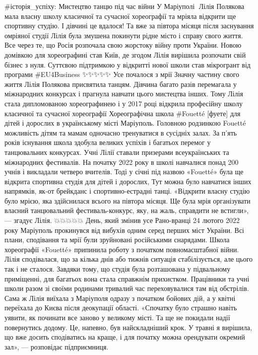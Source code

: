 #історія_успіху: Мистецтво танцю під час війни
У Маріуполі 💃Лілія Полякова мала власну школу класичної та сучасної хореографії та мріяла відкрити ще спортивну студію. І дівчині це вдалося! Та вже за півтора місяця після заснування омріяної студії Лілія була змушена покинути рідне місто і справу свого життя. Все через те, що Росія розпочала свою жорстоку війну проти України. Новою домівкою для хореографині став Київ, де згодом Лілія вирішила розпочати свій бізнес з нуля. Суттєвою підтримкою у відкритті нової школи став мікрогрант від програми #EU4Business
✨✨✨✨✨ Усе почалося з мрії
Значну частину свого життя Лілія Полякова присвятила танцям. Дівчина багато разів перемагала у міжнародних конкурсах і прагнула навчати цього мистецтва інших. Тому Лілія стала дипломованою хореографинею і у 2017 році відкрила професійну школу класичної та сучасної хореографії Хореографічна школа #Fouetté [фуете] для дітей і дорослих в українському місті Маріуполь.
Головною родзинкою Fouetté можливість дітям та мамам одночасно тренуватися в сусідніх залах. За п’ять років існування школа здобула великих успіхів і багатьох перемог у танцювальних конкурсах. Учні Лілії ставали призерами всеукраїнських та міжнародних фестивалів. 
На початку 2022 року в школі навчалися понад 200 учнів і викладали четверо вчителів. Тоді у січні під назвою «Fouetté» була ще відкрита спортивна студія для дітей і дорослих, Тут можна було навчатися інших напрямків, як-от брейкданс і спортивно-естрадні танці.
«Відкрити власну студію було мрією, яка здійснилася всього на півтора місяця. Ще була мрія організувати власний танцювальний фестиваль-конкурс, яку, на жаль, справдити не встигли», — згадує Лілія.
💥💥💥💥💥 День, який змінив усе
Рано-вранці 24 лютого 2022 року Маріуполь прокинувся від вибухів одним серед перших міст України. Всі плани, сподівання та мрії були зруйновані російськими снарядами.
Школа хореографії «Fouetté» припинила роботу з початком повномасштабної війни. Лілія сподівалася, що за кілька днів або тижнів ситуація стабілізується, але цього так і не сталося. Завдяки тому, що студія була розташована у підвальному приміщенні, для багатьох вона стала справжнім прихистком. Працівники та учні школи разом зі своїми родинами тривалий час переховувалися там від обстрілів. 
Сама ж Лілія виїхала з Маріуполя одразу з початком бойових дій, а у квітні переїхала до Києва після деокупації області.
«Спочатку було страшно навіть уявити, як починати все заново у великому місті. Та ще не покидали надії повернутись додому. Це, напевно, був найскладніший крок. У травні я вирішила, що вже досить сподіватись на краще, і для початку можна орендувати окремий зал», — розповідає підприємниця.
